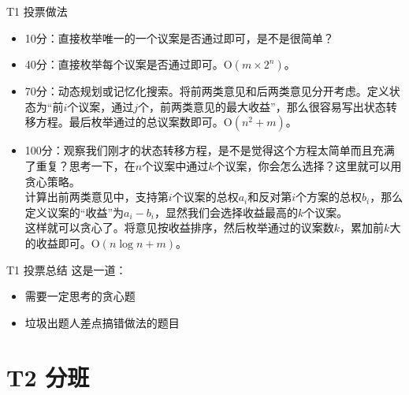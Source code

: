 \documentclass[utf8]{beamer}
\begin{document}
\begin{frame}{T1 投票}{做法}
    \begin{itemize}
        \item 10分：直接枚举唯一的一个议案是否通过即可，是不是很简单？
        \pause
        \item 40分：直接枚举每个议案是否通过即可。$\text{O}(m\times 2^n)$。
        \pause
        \item 70分：动态规划或记忆化搜索。将前两类意见和后两类意见分开考虑。定义状态为“前$i$个议案，通过$j$个，前两类意见的最大收益”，那么很容易写出状态转移方程。最后枚举通过的总议案数即可。$\text{O}(n^2+m)$。
        \pause
        \item 100分：观察我们刚才的状态转移方程，是不是觉得这个方程太简单而且充满了重复？思考一下，在$n$个议案中通过$k$个议案，你会怎么选择？这里就可以用贪心策略。\\
        \pause
        计算出前两类意见中，支持第$i$个议案的总权$a_i$和反对第$i$个方案的总权$b_i$，那么定义议案的“收益”为$a_i-b_i$，显然我们会选择收益最高的$k$个议案。\\
        这样就可以贪心了。将意见按收益排序，然后枚举通过的议案数$k$，累加前$k$大的收益即可。$\text{O}(n\log n+m)$。
    \end{itemize}

\end{frame}
\begin{frame}{T1 投票}{总结}
    这是一道：
    \begin{itemize}
        \item 需要一定思考的贪心题
        \item 垃圾出题人差点搞错做法的题目
    \end{itemize}
\end{frame}
\section{T2 分班}
\end{document}
